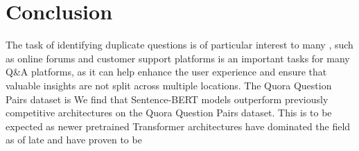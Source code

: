 \documentclass[10pt, a4paper]{article}
\begin{document}
\section{Conclusion} \label{conclusion}

The task of identifying duplicate questions is of particular interest to many , such as online forums and customer support platforms is an important tasks for many Q\&A platforms, as it can help enhance the user experience and ensure that valuable insights are not split across multiple locations.
The Quora Question Pairs dataset is 
We find that Sentence-BERT models outperform previously competitive architectures on the Quora Question Pairs dataset.
This is to be expected as newer pretrained Transformer architectures have dominated the field as of late and have proven to be


 
\end{document}
